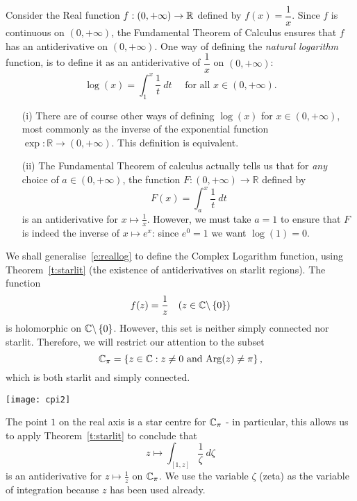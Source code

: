 Consider the Real function $f:(0,+\infty) \to \mathbb{R}$ defined by $f(x) = \dfrac{1}{x}$. Since $f$ is continuous on $(0,+\infty)$, the Fundamental Theorem of Calculus ensures that $f$ has an antiderivative on $(0,+\infty)$.  One way of defining the \emph{natural logarithm} function, is to define it as an antiderivative of $\dfrac{1}{x}$ on $(0,+\infty)$:
\begin{equation}
\label{e:reallog}
\log (x) = \int_1^x \frac{1}{t}\ dt \quad \text{ for all } x \in (0,+\infty).
\end{equation}
\begin{note}
\begin{enumerate}
\item[(i)] There are of course other ways of defining $\log (x)$ for $x \in (0,+\infty)$, most commonly as the inverse of the exponential function $\exp:\mathbb{R} \to (0,+\infty)$.  This definition is equivalent.
\item[(ii)]  The Fundamental Theorem of calculus actually tells us that for \emph{any} choice of $a \in (0,+\infty)$, the function $F: (0,+\infty) \to \mathbb{R}$ defined by
\[
F(x) = \int_a^x \frac{1}{t}\ dt
\]
is an antiderivative for $x \mapsto \frac{1}{x}$.  However, we must take $a=1$ to ensure that $F$ is indeed the inverse of $x \mapsto e^x$: since $e^0=1$ we want $\log (1)=0$.
\end{enumerate}
\end{note}
We shall generalise~\eqref{e:reallog} to define the Complex Logarithm function, using Theorem~\ref{t:starlit} (the existence of antiderivatives on starlit regions).  The function
\[
f(z) = \frac{1}{z}\quad (z \in \mathbb{C} \backslash \left\{0\right\})
\]
is holomorphic on $\mathbb{C} \backslash \left\{0\right\}$. However, this set is neither simply connected nor starlit.  Therefore, we will restrict our attention to the subset
\[
\mathbb{C}_{\pi} = \left\{ z \in \mathbb{C}: z \neq 0 \text{ and } \mathrm{Arg}(z) \neq \pi \right\},
\]
which is both starlit and simply connected. 
\begin{center}
\texttt{[image: cpi2]}
\end{center}
 The point $1$ on the real axis is a star centre for $\mathbb{C}_{\pi}$ - in particular, this allows us to apply Theorem~\ref{t:starlit} to conclude that
\[
z \mapsto \int_{[1,z]} \frac{1}{\zeta}\ d \zeta
\]
is an antiderivative for $z \mapsto \frac{1}{z}$ on $\mathbb{C}_{\pi}$.  We use the variable $\zeta$ (zeta) as the variable of integration because $z$ has been used already.

